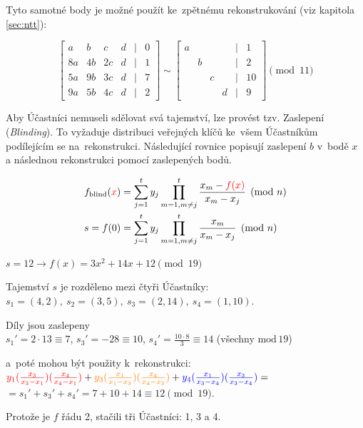 Tyto samotné body je možné použít ke~zpětnému rekonstrukování (viz kapitola \ref{sec:ntt}):

$$\left[\begin{matrix}
 a &  b &  c & d & | & 0 \\
8a & 4b & 2c & d & | & 1 \\
5a & 9b & 3c & d & | & 7 \\
9a & 5b & 4c & d & | & 2
\end{matrix}\right] \sim \left[\begin{matrix}
 a &    &    &   & | & 1 \\
   &  b &    &   & | & 2 \\
   &    &  c &   & | & 10 \\
   &    &    & d & | & 9
\end{matrix}\right] \pmod {11}$$

Aby Účastníci nemuseli sdělovat svá tajemství, lze provést tzv. Zaslepení (\emph{Blinding}).
To vyžaduje distribuci veřejných klíčů ke~všem Účastníkům podílejícím se na~rekonstrukci.
Následující rovnice popisují zaslepení $b$ v~bodě $x$ a následnou rekonstrukci pomocí zaslepených bodů.

\begin{align*}
    f_\text{blind}({\color{red}x}) &= \sum_{j=1}^t y_j \prod_{m=1, m \neq j}^t \frac{x_m - {\color{red}f(x)}}{x_m - x_j} \pmod n
    \\
    s = f(0) &= \sum_{j=1}^t y_j \prod_{m=1, m \neq j}^t \frac{x_m}{x_m - x_j} \pmod n
\end{align*}

\begin{mdframed}
$s=12 \rightarrow f(x) = 3x^2 + 14x + 12 \pmod {19}$

Tajemství $s$ je rozděleno mezi čtyři Účastníky:\\
$s_1 = (4, 2),\ s_2=(3, 5),\ s_3=(2, 14),\ s_4=(1, 10)$.

Díly jsou zaslepeny\\
$s_1' = 2 \cdot 13 \equiv 7$, $s_3' = -28 \equiv 10$, $s_4' = \frac{10 \cdot 8}{3} \equiv 14$ (všechny $\text{mod}\, {19}$)

a~poté mohou být použity k~rekonstrukci:\\
${\color{red} y_1(\frac{x_3}{x_3-x_1})(\frac{x_4}{x_4-x_1})} + {\color{orange} y_3(\frac{x_1}{x_1-x_3})(\frac{x_4}{x_4-x_3})} + {\color{blue} y_4(\frac{x_1}{x_3-x_4})(\frac{x_3}{x_3-x_4})} =$\\
$= s_1' + s_3' + s_4' = 7 + 10 + 14 \equiv 12 \pmod{19}$.

Protože je $f$ řádu 2, stačili tři Účastníci: 1, 3 a 4.
\end{mdframed}


